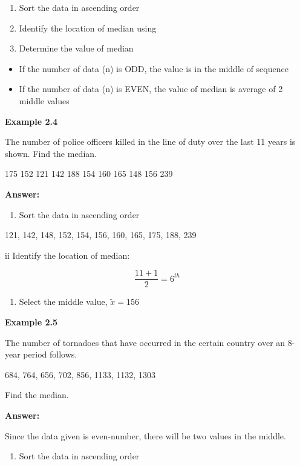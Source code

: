 \documentclass[
  a4paper,
  DIV=11,
  numbers=noendperiod,
  oneside]{scrreprt}
\providecommand{\tightlist}{%
  \setlength{\itemsep}{0pt}\setlength{\parskip}{0pt}}\usepackage{longtable,booktabs,array}
\begin{document}
\begin{enumerate}
\def\labelenumi{\roman{enumi}.}
\tightlist
\item
  Sort the data in ascending order
\item
  Identify the location of median using
\item
  Determine the value of median
\end{enumerate}

\begin{itemize}
\tightlist
\item
  If the number of data (n) is ODD, the value is in the middle of
  sequence
\item
  If the number of data (n) is EVEN, the value of median is average of 2
  middle values
\end{itemize}

{\textbf{Example 2.4}}

The number of police officers killed in the line of duty over the last
11 years is shown. Find the median.

175 152 121 142 188 154 160 165 148 156 239

{\textbf{Answer:}}

\begin{enumerate}
\def\labelenumi{\roman{enumi}.}
\tightlist
\item
  Sort the data in ascending order
\end{enumerate}

121, 142, 148, 152, 154, 156, 160, 165, 175, 188, 239

ii Identify the location of median:

\[
\frac{11 + 1}{2} = 6^{th}
\]

\begin{enumerate}
\def\labelenumi{\roman{enumi}.}
\setcounter{enumi}{2}
\tightlist
\item
  Select the middle value, \(\tilde{x} = 156\)
\end{enumerate}

{\textbf{Example 2.5}}

The number of tornadoes that have occurred in the certain country over
an 8-year period follows.

684, 764, 656, 702, 856, 1133, 1132, 1303

Find the median.

{\textbf{Answer:}}

Since the data given is even-number, there will be two values in the
middle.

\begin{enumerate}
\def\labelenumi{\roman{enumi}.}
\tightlist
\item
  Sort the data in ascending order
\end{enumerate}
\end{document}
